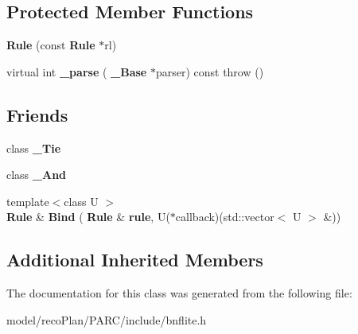 \subsection*{Protected Member Functions}
\begin{DoxyCompactItemize}
\item 
\mbox{\label{classbnf_1_1_rule_afa36b50741ac4b5bcc1e80effa6a2b55}} 
{\bfseries Rule} (const \textbf{ Rule} $\ast$rl)
\item 
\mbox{\label{classbnf_1_1_rule_a0460e1971d96c44b4885d7a72f5aec97}} 
virtual int {\bfseries \+\_\+parse} (\textbf{ \+\_\+\+Base} $\ast$parser) const  throw ()
\end{DoxyCompactItemize}
\subsection*{Friends}
\begin{DoxyCompactItemize}
\item 
\mbox{\label{classbnf_1_1_rule_ab555bd08f573aad86ad95feb76007c15}} 
class {\bfseries \+\_\+\+Tie}
\item 
\mbox{\label{classbnf_1_1_rule_abc37899b09eb024e8e57c00ec8fba682}} 
class {\bfseries \+\_\+\+And}
\item 
\mbox{\label{classbnf_1_1_rule_a3823850d893658658dfba4a9337b47e3}} 
{\footnotesize template$<$class U $>$ }\\\textbf{ Rule} \& {\bfseries Bind} (\textbf{ Rule} \&\textbf{ rule}, U($\ast$callback)(std\+::vector$<$ U $>$ \&))
\end{DoxyCompactItemize}
\subsection*{Additional Inherited Members}


The documentation for this class was generated from the following file\+:\begin{DoxyCompactItemize}
\item 
model/reco\+Plan/\+P\+A\+R\+C/include/bnflite.\+h\end{DoxyCompactItemize}
